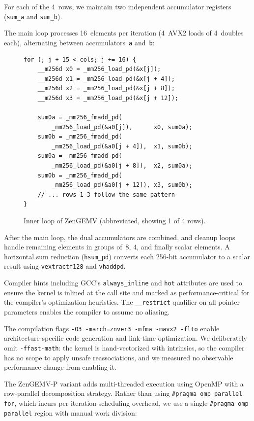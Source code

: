 \documentclass[conference]{IEEEtran}
\begin{document}
For each of the 4~rows, we maintain two independent accumulator registers
(\texttt{sum\_a} and \texttt{sum\_b}).

The main loop processes 16~elements per iteration (4~AVX2 loads of 4~doubles
each), alternating between accumulators~\texttt{a} and~\texttt{b}:

\begin{figure}[tbp]
\begin{verbatim}
for (; j + 15 < cols; j += 16) {
    __m256d x0 = _mm256_load_pd(&x[j]);
    __m256d x1 = _mm256_load_pd(&x[j + 4]);
    __m256d x2 = _mm256_load_pd(&x[j + 8]);
    __m256d x3 = _mm256_load_pd(&x[j + 12]);

    sum0a = _mm256_fmadd_pd(
        _mm256_load_pd(&a0[j]),      x0, sum0a);
    sum0b = _mm256_fmadd_pd(
        _mm256_load_pd(&a0[j + 4]),  x1, sum0b);
    sum0a = _mm256_fmadd_pd(
        _mm256_load_pd(&a0[j + 8]),  x2, sum0a);
    sum0b = _mm256_fmadd_pd(
        _mm256_load_pd(&a0[j + 12]), x3, sum0b);
    // ... rows 1-3 follow the same pattern
}
\end{verbatim}
\caption{Inner loop of ZenGEMV (abbreviated, showing 1 of 4
rows).}
\label{lst:kernel}
\end{figure}

After the main loop, the dual accumulators are combined, and cleanup loops handle
remaining elements in groups of~8, 4, and finally scalar elements.
A horizontal sum reduction (\texttt{hsum\_pd}) converts each 256-bit accumulator
to a scalar result using \texttt{vextractf128} and \texttt{vhaddpd}\cite{avx2}.

Compiler hints including GCC's \texttt{always\_inline} and \texttt{hot}
attributes are used to ensure the kernel is inlined at the call site and marked
as performance-critical for the compiler's optimization heuristics.
The \texttt{\_\_restrict} qualifier on all pointer parameters enables the
compiler to assume no aliasing.

The compilation flags \texttt{-O3 -march=znver3 -mfma -mavx2 -flto}\cite{gccmanual}
enable architecture-specific code generation and link-time optimization.
We deliberately omit \texttt{-ffast-math}: the kernel is hand-vectorized
with intrinsics, so the compiler has no scope to apply unsafe reassociations,
and we measured no observable performance change from enabling it.

The ZenGEMV-P variant adds multi-threaded execution using OpenMP\cite{chandra2001parallel} with a
row-parallel decomposition strategy. Rather than using \texttt{\#pragma omp
parallel for}, which incurs per-iteration scheduling overhead, we use a single
\texttt{\#pragma omp parallel} region with manual work division:
\end{document}
